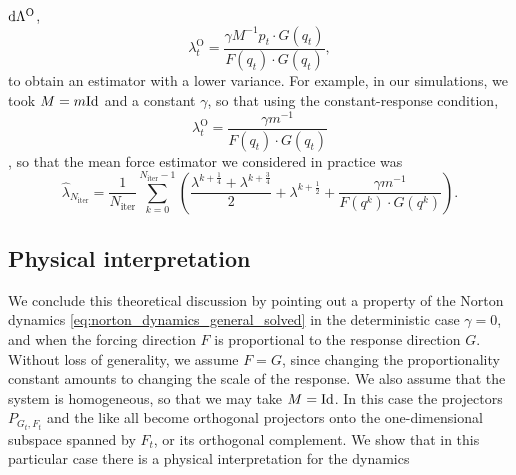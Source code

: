 \begin{example}
    $\mathrm{d} \Lambda^{\mathrm{O}}$,
    \[\lambda_t^{\mathrm{O}}=\frac{\gamma M^{-1}p_t\cdot G(q_t)}{F(q_t)\cdot G(q_t)},\]
    to obtain an estimator with a lower variance. For example, in our simulations, we took $M=m\mathrm{Id}$ and a constant $\gamma$, so that using the constant-response condition, 
    \[\lambda_t^{\mathrm{O}}=\frac{\gamma m^{-1}}{F(q_t)\cdot G(q_t)}\],
    so that the mean force estimator we considered in practice was 
    \begin{equation}
        \label{eq:norton_mean_force_estimator_practical}
        \widehat{\lambda}_{N_\mathrm{iter}}=\frac1{N_{\mathrm{iter}}}\sum_{k=0}^{N_{\mathrm{iter}}-1} \left(\frac{\lambda^{k+\frac14}+\lambda^{k+\frac34}}2+\lambda^{k+\frac12}+\frac{\gamma m^{-1}}{F(q^k)\cdot G(q^k)}\right).
    \end{equation}
\end{example}

\subsection{Physical interpretation}
We conclude this theoretical discussion by pointing out a property of the Norton dynamics \eqref{eq:norton_dynamics_general_solved} in the deterministic case $\gamma=0$, and when the forcing direction $F$ is proportional to the response direction $G$.
Without loss of generality, we assume $F=G$, since changing the proportionality constant amounts to changing the scale of the response.
We also assume that the system is homogeneous, so that we may take $M=\mathrm{Id}$.
In this case the projectors $P_{G_t,F_t}$ and the like all become orthogonal projectors onto the one-dimensional subspace spanned by $F_t$, or its orthogonal complement.
We show that in this particular case there is a physical interpretation for the dynamics

